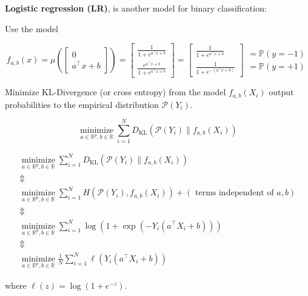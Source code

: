 \documentclass{report}
\begin{document}
\begin{definition}
    \textbf{Logistic regression (LR)}, is another model for binary classification:

    Use the model

    $$
    f_{a, b}(x)=
    \mu\left(\left[\begin{array}{c}0 \\
    a^{\top} x+b
    \end{array}\right]\right)
    = \left[\begin{array}{c}
    \frac{1}{1+e^{a^{\top} x+b}} \\
    \frac{e^{a^{\top} x+b}}{1+e^{a^{\top} x+b}}
    \end{array}\right]=\left[\begin{array}{c}
    \frac{1}{1+e^{a^{\top} x+b}} \\
    \frac{1}{1+e^{-\left(a^{\top} x+b\right)}}
    \end{array}\right]\begin{array}{c}
    = \mathbb{P}(y=-1) \\
    = \mathbb{P}(y=+1)
    \end{array}
    $$

    Minimize KL-Divergence (or cross entropy) from the model $f_{a, b}\left(X_{i}\right)$ output probabilities to the empirical distribution $\mathcal{P}\left(Y_{i}\right)$.

    $$
    \underset{a \in \mathbb{R}^{p}, b \in \mathbb{R}}{\operatorname{minimize}} \sum_{i=1}^{N} D_{\mathrm{KL}}\left(\mathcal{P}\left(Y_{i}\right) \| f_{a, b}\left(X_{i}\right)\right)
    $$
\end{definition}

\begin{concept}
    $$
    \begin{gathered}
    \underset{a \in \mathbb{R}^{p}, b \in \mathbb{R}}{\operatorname{minimize}} \sum_{i=1}^{N} D_{\mathrm{KL}}\left(\mathcal{P}\left(Y_{i}\right) \| f_{a, b}\left(X_{i}\right)\right) \\
    \mathbb{\Updownarrow} \\
    \underset{a \in \mathbb{R}^{p}, b \in \mathbb{R}}{\operatorname{minimize}} \sum_{i=1}^{N} H\left(\mathcal{P}\left(Y_{i}\right), f_{a, b}\left(X_{i}\right)\right)+(\text { terms independent of } a, b) \\
    \mathbb{\Updownarrow} \\
    \underset{a \in \mathbb{R}^{p}, b \in \mathbb{R}}{\operatorname{minimize}} \sum_{i=1}^{N} \log \left(1+\exp \left(-Y_{i}\left(a^{\top} X_{i}+b\right)\right)\right) \\
    \mathbb{\Updownarrow} \\
    \underset{a \in \mathbb{R}^{p}, b \in \mathbb{R}}{\operatorname{minimize}} \frac{1}{N} \sum_{i=1}^{N} \ell\left(Y_{i}\left(a^{\top} X_{i}+b\right)\right)
    \end{gathered}
    $$

    where $\ell(z)=\log \left(1+e^{-z}\right)$.
\end{concept}
\end{document}
